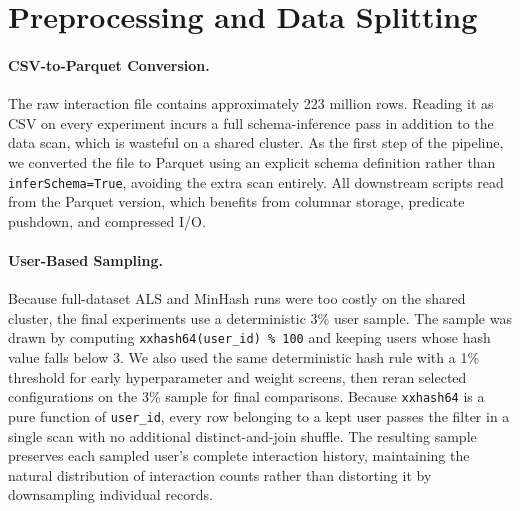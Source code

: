 \documentclass[10pt,twocolumn]{article}
\begin{document}

\section*{Preprocessing and Data Splitting}

\paragraph{CSV-to-Parquet Conversion.} The raw interaction file contains approximately 223 million rows. Reading it as CSV on every experiment incurs a full schema-inference pass in addition to the data scan, which is wasteful on a shared cluster. As the first step of the pipeline, we converted the file to Parquet using an explicit schema definition rather than \texttt{inferSchema=True}, avoiding the extra scan entirely. All downstream scripts read from the Parquet version, which benefits from columnar storage, predicate pushdown, and compressed I/O.

\paragraph{User-Based Sampling.} Because full-dataset ALS and MinHash runs were too costly on the shared cluster, the final experiments use a deterministic 3\% user sample. The sample was drawn by computing \texttt{xxhash64(user\_id) \% 100} and keeping users whose hash value falls below 3. We also used the same deterministic hash rule with a 1\% threshold for early hyperparameter and weight screens, then reran selected configurations on the 3\% sample for final comparisons. Because \texttt{xxhash64} is a pure function of \texttt{user\_id}, every row belonging to a kept user passes the filter in a single scan with no additional distinct-and-join shuffle. The resulting sample preserves each sampled user's complete interaction history, maintaining the natural distribution of interaction counts rather than distorting it by downsampling individual records.
\end{document}
